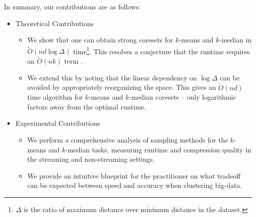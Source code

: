 In summary, our contributions are as follows:
\begin{itemize}
    \item Theoretical Contributions
    \begin{itemize}
        \item We show that one can obtain strong coresets for $k$-means and $k$-median in $\tilde{O}(nd \log \Delta)$ time\footnote{$\Delta$ is the ratio of maximum distance over minimum
distance in the dataset.}. This resolves a conjecture that the runtime requires an $\tilde{O}(nk)$ term \cite{DSWY22}.
        \item We extend this by noting that the linear dependency on $\log \Delta$ can be avoided by appropriately reorganizing the space. This gives an $\tilde{O}(nd)$
time algorithm for $k$-means and $k$-median coresets -- only logarithmic factors away from the optimal runtime.
    \end{itemize}
    \item Experimental Contributions
    \begin{itemize}
        \item We perform a comprehensive analysis of sampling methods for the $k$-means and $k$-median tasks, measuring runtime and compression quality in
the streaming and non-streaming settings.
        \item We provide an intuitive blueprint for the practitioner on what tradeoff can be expected between speed and accuracy when clustering big-data.
    \end{itemize}
\end{itemize}
